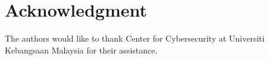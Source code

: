 \documentclass[conference]{IEEEtran}
\begin{document}
\section*{Acknowledgment}


The authors would like to thank Center for Cybersecurity at Universiti Kebangsaan Malaysia for their assistance.







%
%
%
%
%
%
%
\end{document}
